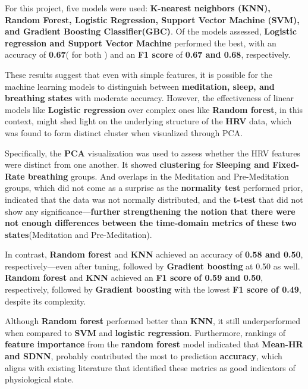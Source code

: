 \documentclass[
  11pt,
]{ieee}
\begin{document}
\vspace{0.8em}

For this project, five models were used: \textbf{K-nearest neighbors
(KNN), Random Forest, Logistic Regression, Support Vector Machine (SVM),
and Gradient Boosting Classifier(GBC)}. Of the models assessed,
\textbf{Logistic regression and Support Vector Machine} performed the
best, with an accuracy of \textbf{0.67}( for both ) and an \textbf{F1
score} of \textbf{0.67 and 0.68}, respectively.

These results suggest that even with simple features, it is possible for
the machine learning models to distinguish between \textbf{meditation,
sleep, and breathing states} with moderate accuracy. However, the
effectiveness of linear models like \textbf{Logistic regression} over
complex ones like \textbf{Random forest}, in this context, might shed
light on the underlying structure of the \textbf{HRV} data, which was
found to form distinct cluster when visualized through PCA.

Specifically, the \textbf{PCA} visualization was used to assess whether
the HRV features were distinct from one another. It showed
\textbf{clustering} for \textbf{Sleeping and Fixed-Rate breathing}
groups. And overlaps in the Meditation and Pre-Meditation groups, which
did not come as a surprise as the \textbf{normality test} performed
prior, indicated that the data was not normally distributed, and the
\textbf{t-test} that did not show any significance---\textbf{further
strengthening the notion that there were not enough differences between
the time-domain metrics of these two states}(Meditation and
Pre-Meditation).

In contrast, \textbf{Random forest} and \textbf{KNN} achieved an
accuracy of \textbf{0.58 and 0.50}, respectively---even after tuning,
followed by \textbf{Gradient boosting} at 0.50 as well. \textbf{Random
forest} and \textbf{KNN} achieved an \textbf{F1 score} \textbf{of 0.59
and 0.50}, respectively, followed by \textbf{Gradient boosting} with the
lowest \textbf{F1 score of 0.49}, despite its complexity.

Although \textbf{Random forest} performed better than \textbf{KNN}, it
still underperformed when compared to \textbf{SVM} and \textbf{logistic
regression}. Furthermore, rankings of \textbf{feature importance} from
the \textbf{random forest} model indicated that \textbf{Mean-HR and
SDNN}, probably contributed the most to prediction \textbf{accuracy},
which aligns with existing literature that identified these metrics as
good indicators of physiological state.
\end{document}

